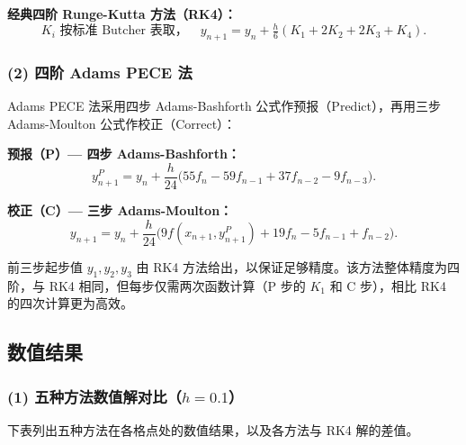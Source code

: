 \documentclass[UTF8,a4paper,11pt]{article}
\begin{document}
\textbf{经典四阶 Runge-Kutta 方法（RK4）：}
\[
  K_i \text{ 按标准 Butcher 表取}，\quad
  y_{n+1} = y_n + \tfrac{h}{6}(K_1 + 2K_2 + 2K_3 + K_4).
\]

\subsubsection*{(2) 四阶 Adams PECE 法}

Adams PECE 法采用四步 Adams-Bashforth 公式作预报（Predict），再用三步 Adams-Moulton 公式作校正（Correct）：

\textbf{预报（P）— 四步 Adams-Bashforth：}
\[
  y_{n+1}^{P} = y_n + \frac{h}{24}\bigl(55f_n - 59f_{n-1} + 37f_{n-2} - 9f_{n-3}\bigr).
\]

\textbf{校正（C）— 三步 Adams-Moulton：}
\[
  y_{n+1} = y_n + \frac{h}{24}\bigl(9f(x_{n+1}, y_{n+1}^{P}) + 19f_n - 5f_{n-1} + f_{n-2}\bigr).
\]

前三步起步值 $y_1, y_2, y_3$ 由 RK4 方法给出，以保证足够精度。该方法整体精度为四阶，与 RK4 相同，但每步仅需两次函数计算（P 步的 $K_1$ 和 C 步），相比 RK4 的四次计算更为高效。

\subsection{数值结果}

\subsubsection*{(1) 五种方法数值解对比（$h=0.1$）}

下表列出五种方法在各格点处的数值结果，以及各方法与 RK4 解的差值。
\end{document}
